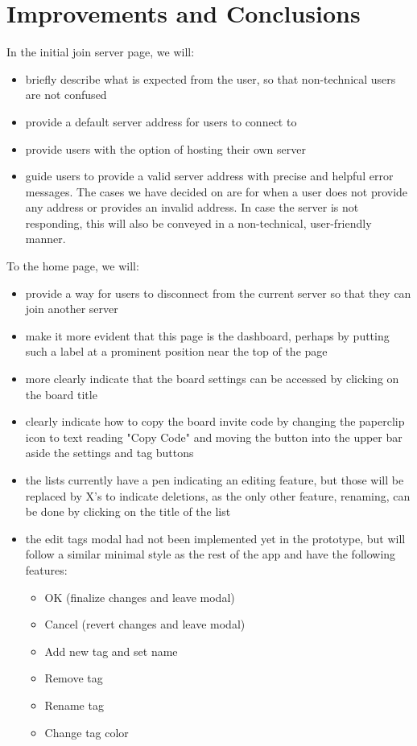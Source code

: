 \section{Improvements and Conclusions}


\vspace{2mm}

In the initial join server page, we will:
\begin{itemize}
    \item briefly describe what is expected from the user, so that non-technical users are not confused
    \item provide a default server address for users to connect to
    \item provide users with the option of hosting their own server
    \item guide users to provide a valid server address with precise and helpful error messages. The cases we have decided on are for when a user does not provide any address or provides an invalid address. In case the server is not responding, this will also be conveyed in a non-technical, user-friendly manner.
\end{itemize}

\vspace{2mm}

To the home page, we will:
\begin{itemize}
    \item provide a way for users to disconnect from the current server so that they can join another server
    \item make it more evident that this page is the dashboard, perhaps by putting such a label at a prominent position near the top of the page
    \item more clearly indicate that the board settings can be accessed by clicking on the board title
    \item clearly indicate how to copy the board invite code by changing the paperclip icon to text reading "Copy Code" and moving the button into the upper bar aside the settings and tag buttons
    \item the lists currently have a pen indicating an editing feature, but those will be replaced by X's to indicate deletions, as the only other feature, renaming, can be done by clicking on the title of the list
    \item the edit tags modal had not been implemented yet in the prototype, but will follow a similar minimal style as the rest of the app and have the following features:
    \begin{itemize}
        \item OK (finalize changes and leave modal)
        \item Cancel (revert changes and leave modal)
        \item Add new tag and set name
        \item Remove tag
        \item Rename tag
        \item Change tag color
    \end{itemize}
\end{itemize}

